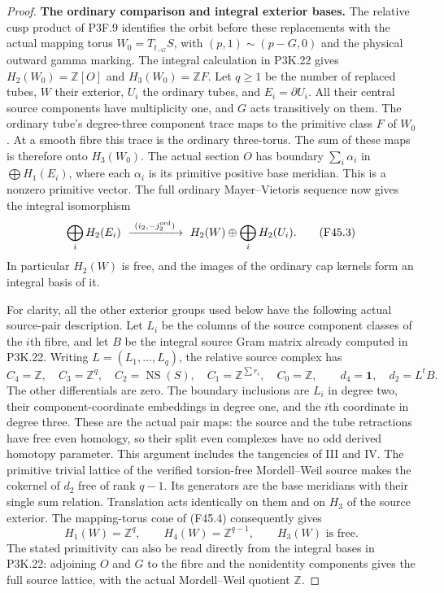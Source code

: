 \begin{proof}
\par\medskip\noindent\textbf{The ordinary comparison and integral exterior bases.}\enspace
The relative cusp product of P3F.9 identifies the orbit before
these replacements with the actual mapping torus
$W_0=T_{t_{-G}}S$, with $(p,1)\sim(p-G,0)$ and the physical
outward gamma marking. The integral calculation in P3K.22 gives
$H_2(W_0)=\mathbb Z[O]$ and $H_3(W_0)=\mathbb ZF$.
Let $q\geq1$ be the number of replaced tubes, $W$ their exterior,
$U_i$ the ordinary tubes, and $E_i=\partial U_i$.
All their central source components have multiplicity one, and
$G$ acts transitively on them. The ordinary tube's degree-three
component trace maps to the primitive class $F$ of $W_0$.
At a smooth fibre this trace is the ordinary three-torus.
The sum of these maps is therefore onto $H_3(W_0)$.
The actual section $O$ has boundary $\sum_i\alpha_i$ in
$\bigoplus H_1(E_i)$, where each $\alpha_i$ is its primitive
positive base meridian. This is a nonzero primitive vector.
The full ordinary Mayer--Vietoris sequence now gives the integral
isomorphism
\[
 \bigoplus_iH_2(E_i)
       \ \xrightarrow{\ (i_2,-j_2^{\rm ord})\ }\
 H_2(W)\oplus\bigoplus_iH_2(U_i).                    \tag{F45.3}
\]
In particular $H_2(W)$ is free, and the images of the ordinary
cap kernels form an integral basis of it.

For clarity, all the other exterior groups used below have the
following actual source-pair description. Let $L_i$ be the columns
of the source component classes of the $i$th fibre, and let $B$
be the integral source Gram matrix already computed in P3K.22.
Writing $L=(L_1,\ldots,L_q)$, the relative source complex has
\[
 C_4=\mathbb Z,\quad C_3=\mathbb Z^q,\quad
 C_2=\operatorname{NS}(S),\quad C_1=\mathbb Z^{\sum r_i},
 \quad C_0=\mathbb Z,
 \qquad d_4=\mathbf1,\quad d_2=L^tB.                 \tag{F45.4}
\]
The other differentials are zero. The boundary inclusions are
$L_i$ in degree two, their component-coordinate embeddings in
degree one, and the $i$th coordinate in degree three. These are
the actual pair maps: the source and the tube retractions have
free even homology, so their split even complexes have no odd
derived homotopy parameter. This argument includes the tangencies
of III and IV. The primitive trivial lattice of the verified
torsion-free Mordell--Weil source makes the cokernel of $d_2$
free of rank $q-1$. Its generators are the base meridians with
their single sum relation. Translation acts identically on them
and on $H_3$ of the source exterior. The mapping-torus cone of
(F45.4) consequently gives
\[
 H_1(W)=\mathbb Z^q,\qquad H_4(W)=\mathbb Z^{q-1},
 \qquad H_3(W)\text{ is free}.                       \tag{F45.5}
\]
The stated primitivity can also be read directly from the
integral bases in P3K.22: adjoining $O$ and $G$ to the fibre and
the nonidentity components gives the full source lattice, with
the actual Mordell--Weil quotient $\mathbb Z$.


\end{proof}
